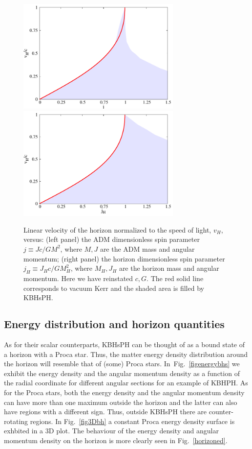 \begin{figure}[h!]
  \begin{center}
    \includegraphics[width=8.1cm]{papers/Proca/ProcaBH-j-v-bound.pdf}
      \includegraphics[width=8.1cm]{papers/Proca/ProcaBH-jKv-bound.pdf}
  \end{center}
 \caption{Linear velocity of the horizon normalized to the speed of light, $v_H$, versus:  (left panel)  the ADM dimensionless spin parameter $j\equiv Jc/GM^2$, where $M,J$ are the ADM mass and angular momentum; (right panel) the horizon dimensionless spin parameter $j_H\equiv J_Hc/GM_H^2$, where $M_H,J_H$ are the horizon mass and angular momentum. Here we have reinstated $c,G$. The red solid line corresponds to vacuum Kerr and the shaded area is filled by KBHsPH.}
  \label{vconjecture}
\end{figure}

\subsection{Energy distribution and horizon quantities}
\label{subsec_IV}
As for their scalar counterparts, KBHsPH can be thought of as a bound state of a horizon with a Proca star.
Thus, the matter energy density distribution around the horizon will resemble that of (some) Proca stars.
In~Fig.~\ref{figenergybhs} we exhibit the energy density and the angular momentum density as a function of the radial coordinate for different angular sections for an example of KBHPH.
As for the Proca stars, both the energy density and the angular momentum density can have more than one maximum outside the horizon and the latter can also have regions with a different sign.
Thus, outside KBHsPH there are counter-rotating regions.
In Fig.~\ref{fig3Dbh} a constant Proca energy density surface is exhbited in a 3D plot.
The behaviour of the energy density and angular momentum density on the horizon is more clearly seen in Fig.~\ref{horizoned}.



